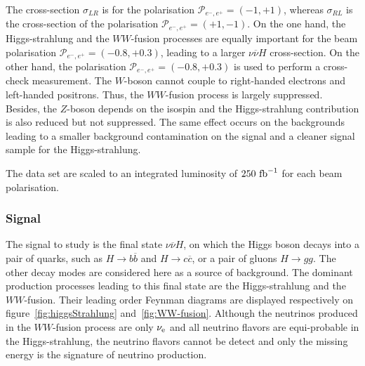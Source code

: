      The cross-section $\sigma_{LR}$ is for the polarisation $\mathcal{P}_{e^-,e^+} = (-1,+1)$, whereas $\sigma_{RL}$ is the cross-section of the polarisation $\mathcal{P}_{e^-,e^+} = (+1,-1)$.
     On the one hand, the Higgs-strahlung and the $WW$-fusion processes are equally important for the beam polarisation  $\mathcal{P}_{e^-,e^+} = (-0.8,+0.3)$, leading to a larger $\nu\overline{\nu} H$ cross-section.
     On the other hand, the polarisation $\mathcal{P}_{e^-,e^+} = (-0.8,+0.3)$ is used to perform a cross-check measurement.
     The $W$-boson cannot couple to right-handed electrons and left-handed positrons.
     Thus, the $WW$-fusion process is largely suppressed.
     Besides, the $Z$-boson depends on the isospin and the Higgs-strahlung contribution is also reduced but not suppressed.
     The same effect occurs on the backgrounds leading to a smaller background contamination on the signal and a cleaner signal sample for the Higgs-strahlung.

     The data set are scaled to an integrated luminosity of $250~\rm{fb}^{-1}$ for each beam polarisation.

  \subsubsection{Signal}

    The signal to study is the final state $\nu\overline{\nu}H$, on which the Higgs boson decays into a pair of quarks, such as $H \rightarrow b\overline{b}$ and $H \rightarrow c\overline{c}$, or a pair of gluons $H \rightarrow gg$. 
    The other decay modes are considered here as a source of background. 
    The dominant production processes leading to this final state are the Higgs-strahlung and the $WW$-fusion.
    Their leading order Feynman diagrams are displayed respectively on figure~\ref{fig:higgsStrahlung} and~\ref{fig:WW-fusion}.
    Although the neutrinos produced in the $WW$-fusion process are only $\nu_{\rm{e}}$ and all neutrino flavors are equi-probable in the Higgs-strahlung, the neutrino flavors cannot be detect and only the missing energy is the signature of neutrino production.


